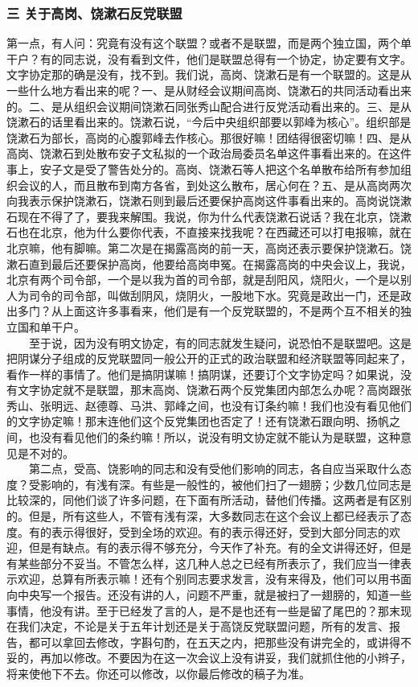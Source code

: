 \documentclass[cn,11pt,chinese]{elegantbook}
\def\myformat#1{\hfil\hfil #1}
\begin{document}
\subsubsection*{\myformat{三 关于高岗、饶漱石反党联盟}}
第一点，有人问：究竟有没有这个联盟？或者不是联盟，而是两个独立国，两个单干户？有的同志说，没有看到文件，他们是联盟总得有一个协定，协定要有文字。文字协定那的确是没有，找不到。我们说，高岗、饶漱石是有一个联盟的。这是从一些什么地方看出来的呢？一、是从财经会议期间高岗、饶漱石的共同活动看出来的。二、是从组织会议期间饶漱石同张秀山配合进行反党活动看出来的。三、是从饶漱石的话里看出来的。饶漱石说，“今后中央组织部要以郭峰为核心”。组织部是饶漱石为部长，高岗的心腹郭峰去作核心。那很好嘛！团结得很密切嘛！四、是从高岗、饶漱石到处散布安子文私拟的一个政治局委员名单这件事看出来的。在这件事上，安子文是受了警告处分的。高岗、饶漱石等人把这个名单散布给所有参加组织会议的人，而且散布到南方各省，到处这么散布，居心何在？五、是从高岗两次向我表示保护饶漱石，饶漱石则到最后还要保护高岗这件事看出来的。高岗说饶漱石现在不得了了，要我来解围。我说，你为什么代表饶漱石说话？我在北京，饶漱石也在北京，他为什么要你代表，不直接来找我呢？在西藏还可以打电报嘛，就在北京嘛，他有脚嘛。第二次是在揭露高岗的前一天，高岗还表示要保护饶漱石。饶漱石直到最后还要保护高岗，他要给高岗申冤。在揭露高岗的中央会议上，我说，北京有两个司令部，一个是以我为首的司令部，就是刮阳风，烧阳火，一个是以别人为司令的司令部，叫做刮阴风，烧阴火，一股地下水。究竟是政出一门，还是政出多门？从上面这许多事看来，他们是有一个反党联盟的，不是两个互不相关的独立国和单干户。\\
　　至于说，因为没有明文协定，有的同志就发生疑问，说恐怕不是联盟吧。这是把阴谋分子组成的反党联盟同一般公开的正式的政治联盟和经济联盟等同起来了，看作一样的事情了。他们是搞阴谋嘛！搞阴谋，还要订个文字协定吗？如果说，没有文字协定就不是联盟，那末高岗、饶漱石两个反党集团内部怎么办呢？高岗跟张秀山、张明远、赵德尊、马洪、郭峰之间，也没有订条约嘛！我们也没有看见他们的文字协定嘛！那末连他们这个反党集团也否定了！还有饶漱石跟向明、扬帆之间，也没有看见他们的条约嘛！所以，说没有明文协定就不能认为是联盟，这种意见是不对的。\\
　　第二点，受高、饶影响的同志和没有受他们影响的同志，各自应当采取什么态度？受影响的，有浅有深。有些是一般性的，被他们扫了一翅膀；少数几位同志是比较深的，同他们谈了许多问题，在下面有所活动，替他们传播。这两者是有区别的。但是，所有这些人，不管有浅有深，大多数同志在这个会议上都已经表示了态度。有的表示得很好，受到全场的欢迎。有的表示得还好，受到大部分同志的欢迎，但是有缺点。有的表示得不够充分，今天作了补充。有的全文讲得还好，但是有某些部分不妥当。不管怎么样，这几种人总之已经有所表示了，我们应当一律表示欢迎，总算有所表示嘛！还有个别同志要求发言，没有来得及，他们可以用书面向中央写一个报告。还没有讲的人，问题不严重，就是被扫了一翅膀的，知道一些事情，他没有讲。至于已经发了言的人，是不是也还有一些是留了尾巴的？那末现在我们决定，不论是关于五年计划还是关于高饶反党联盟问题，所有的发言、报告，都可以拿回去修改，字斟句酌，在五天之内，把那些没有讲完全的，或讲得不妥的，再加以修改。不要因为在这一次会议上没有讲妥，我们就抓住他的小辫子，将来使他下不去。你还可以修改，以你最后修改的稿子为准。\\
\end{document}

